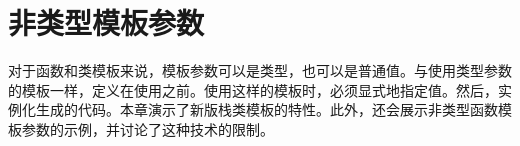 \chapter{非类型模板参数}
对于函数和类模板来说，模板参数可以是类型，也可以是普通值。与使用类型参数的模板一样，定义在使用之前。使用这样的模板时，必须显式地指定值。然后，实例化生成的代码。本章演示了新版栈类模板的特性。此外，还会展示非类型函数模板参数的示例，并讨论了这种技术的限制。




